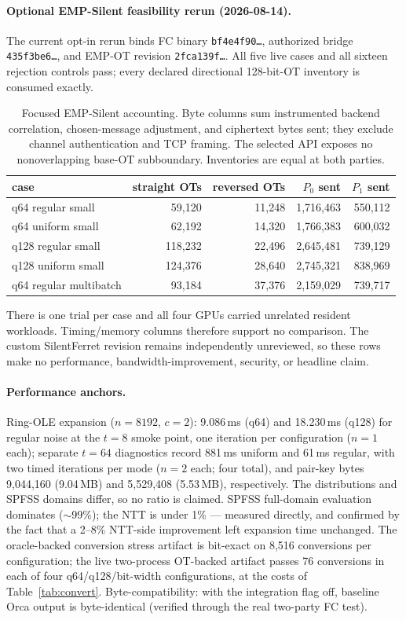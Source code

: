 \documentclass[11pt]{article}
\begin{document}
\paragraph{Optional EMP-Silent feasibility rerun (2026-08-14).}
The current opt-in rerun binds FC binary \texttt{bf4e4f90\ldots}, authorized
bridge \texttt{435f3be6\ldots}, and EMP-OT revision
\texttt{2fca139f\ldots}. All five live cases and all sixteen rejection controls
pass; every declared directional 128-bit-OT inventory is consumed exactly.
\begin{table}[ht]
\centering
\small
\begin{tabular}{@{}l r r r r@{}}
\toprule
case & straight OTs & reversed OTs & $P_0$ sent & $P_1$ sent\\
\midrule
q64 regular small & 59{,}120 & 11{,}248 & 1{,}716{,}463 & 550{,}112\\
q64 uniform small & 62{,}192 & 14{,}320 & 1{,}766{,}383 & 600{,}032\\
q128 regular small & 118{,}232 & 22{,}496 & 2{,}645{,}481 & 739{,}129\\
q128 uniform small & 124{,}376 & 28{,}640 & 2{,}745{,}321 & 838{,}969\\
q64 regular multibatch & 93{,}184 & 37{,}376 & 2{,}159{,}029 & 739{,}717\\
\bottomrule
\end{tabular}
\caption{Focused EMP-Silent accounting. Byte columns sum instrumented backend
correlation, chosen-message adjustment, and ciphertext bytes sent; they exclude
channel authentication and TCP framing. The selected API exposes no
nonoverlapping base-OT subboundary. Inventories are equal at both parties.}
\label{tab:emp-silent}
\end{table}
There is one trial per case and all four GPUs carried unrelated resident
workloads. Timing/memory columns therefore support no comparison. The custom
SilentFerret revision remains independently unreviewed, so these rows make no
performance, bandwidth-improvement, security, or headline claim.

\paragraph{Performance anchors.}
Ring-OLE expansion ($n{=}8192$, $c{=}2$): 9.086\,ms (q64) and 18.230\,ms
(q128) for regular noise at the $t{=}8$ smoke point, one iteration per
configuration ($n{=}1$ each); separate $t{=}64$ diagnostics record 881\,ms
uniform and 61\,ms regular, with two timed iterations per mode ($n{=}2$ each;
four total), and pair-key bytes 9{,}044{,}160 (9.04\,MB) and 5{,}529{,}408
(5.53\,MB), respectively. The distributions and SPFSS domains differ, so no
ratio is claimed. SPFSS full-domain evaluation dominates
($\sim$99\%); the NTT is under 1\% ---
measured directly, and confirmed by the fact that a 2--8\% NTT-side
improvement left expansion time unchanged. The oracle-backed conversion stress
artifact is bit-exact on 8{,}516 conversions per configuration; the live
two-process OT-backed artifact passes 76 conversions in each of four
q64/q128/bit-width configurations, at the costs of
Table~\ref{tab:convert}. Byte-compatibility: with the integration flag off,
baseline Orca output is byte-identical (verified through the real two-party
FC test).
\end{document}
